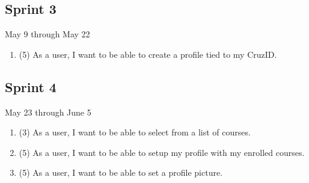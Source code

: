 \documentclass[10pt]{article}
\begin{document}
    \subsection{Sprint 3}
    May 9 through May 22
    \begin{enumerate}
        \item (5) As a user, I want to be able to create a profile tied to my CruzID.
    \end{enumerate}

    \subsection{Sprint 4}
    May 23 through June 5
    \begin{enumerate}
        \item (3) As a user, I want to be able to select from a list of courses.
        \item (5) As a user, I want to be able to setup my profile with my enrolled courses.
        \item (5) As a user, I want to be able to set a profile picture.
    \end{enumerate}
\end{document}
